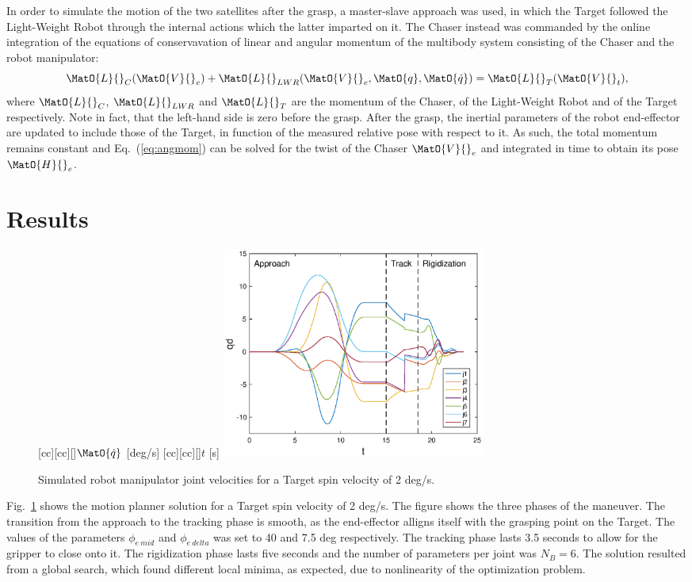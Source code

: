 In order to simulate the motion of the two satellites after the grasp, a master-slave approach was used, in which the Target followed the Light-Weight Robot through the internal actions which the latter imparted on it. The Chaser instead was commanded by the online integration of the equations of conservavation of linear and angular momentum of the multibody system consisting of the Chaser and the robot manipulator:
\begin{equation}
\MatO{L}{}_{C}(\MatO{V}{}_{e}) + \MatO{L}{}_{LWR}(\MatO{V}{}_{e}, \MatO{q}, \MatO{\dot{q}}) = \MatO{L}{}_{T}(\MatO{V}{}_{t}),
\label{eq:angmom}
\end{equation}
where $\MatO{L}{}_{C}$, $\MatO{L}{}_{LWR}$ and $\MatO{L}{}_{T}$ are the momentum of the Chaser, of the Light-Weight Robot and of the Target respectively. Note in fact, that the left-hand side is zero before the grasp. After the grasp, the inertial parameters of the robot end-effector are updated to include those of the Target, in function of the measured relative pose with respect to it. As such, the total momentum remains constant and Eq.~(\ref{eq:angmom}) can be solved for the twist of the Chaser $\MatO{V}{}_{e}$ and integrated in time to obtain its pose $\MatO{H}{}_{e}$.
%
\section{Results}
%
%
\begin{figure}[t!]
[cc][cc][\FontFigB]{$\MatO{\dot{q}}$ [deg/s]}
[cc][cc][\FontFigB]{$t$ [s]}
\centering\includegraphics[angle=0,width=0.42\textwidth]{./figures/Joint_vel_2degs}
\caption{Simulated robot manipulator joint velocities for a Target spin velocity of 2 deg/s.}
\label{fig:Joint_vel_2degs}
\end{figure}
%
Fig.~\ref{fig:Joint_vel_2degs} shows the motion planner solution for a Target spin velocity of 2 deg/s. The figure shows the three phases of the maneuver. The transition from the approach to the tracking phase is smooth, as the end-effector alligns itself with the grasping point on the Target. The values of the parameters $\phi_{e \: mid}$ and $\phi_{e \: delta}$  was set to 40 and 7.5 deg respectively. The tracking phase lasts 3.5 seconds to allow for the gripper to close onto it. The rigidization phase lasts five seconds and the number of parameters per joint was $N_B=6$. The solution resulted from a global search,  which found different local minima, as expected, due to nonlinearity of the optimization problem. 


